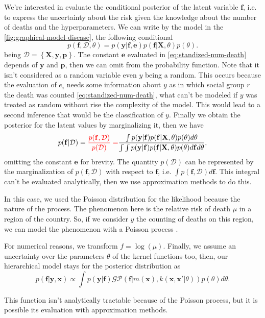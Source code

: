 We're interested in evaluate the conditional posterior of the latent variable $\mathbf{f}$, i.e. to express the uncertainty about the risk given the knowledge about the number of deaths and the hyperparameters. We can write by the model in the \autoref{fig:graphical-model-disease}, the following conditional
%
\begin{equation}
    p(\mathbf{f},\mathcal{D},\theta) = p(\mathbf{y}|\mathbf{f},\mathbf{e})p(\mathbf{f}|\mathbf{X},\theta)p(\theta).
    \label{eq:model-total-density}
\end{equation}
%
being $\mathcal{D}=\left\{ \mathbf{X},\mathbf{y}, \mathbf{p} \right\}$. The constant $\mathbf{e}$ evaluated in \eqref{eq:standized-num-death} depends of $\mathbf{y}$ and $\mathbf{p}$, then we can omit from the probability function. Note that it isn't considered as a random variable even $y$ being a random. This occurs because the evaluation of $e_i$ needs some information about $y$ as in which social group $r$ the death was counted \eqref{eq:standized-num-death}, what can't be modeled if $y$ was treated as random without rise the complexity of the model. This would lead to a second inference that would be the classification of $y$. Finally we obtain the posterior for the latent values by marginalizing it, then we have
%
\begin{equation}
    p(\mathbf{f}|\mathcal{D})={\color{red}
    \frac{p(\mathbf{f},\mathcal{D})}{p(\mathcal{D})}=}
    \frac{\int p(\mathbf{y}|\mathbf{f})p(\mathbf{f}|\mathbf{X},\theta)p(\theta) d\theta}{\int \int p(\mathbf{y}|\mathbf{f})p(\mathbf{f}|\mathbf{X},\theta)p(\theta) d\mathbf{f} d\theta},
\end{equation}
%
omitting the constant $\mathbf{e}$ for brevity. The quantity $p(\mathcal{D})$ can be represented by the marginalization of $p(\mathbf{f},\mathcal{D})$ with respect to $\mathbf{f}$, i.e. $\int p(\mathbf{f},\mathcal{D}) d\mathbf{f}$. This integral can't be evaluated analytically, then we use approximation methods to do this.
{\color{red}
%

In this case, we used the Poisson distribution for the likelihood because the nature of the process. The phenomenon here is the relative risk of death $\mu$ in a region of the country. So, if we consider $y$ the counting of deaths on this region, we can model the phenomenon with a Poisson process \cite{Vanhatalo2010Vehtari}.

For numerical reasons, we transform $f=\log(\mu)$. Finally, we assume an uncertainty over the parameters $\theta$ of the kernel functions too, then, our hierarchical model stays for the posterior distribution as 
%
\begin{equation}
    p(\mathbf{f}|\mathbf{y},\mathbf{x}) \propto \int p(\mathbf{y}|\mathbf{f})\mathcal{GP}\left(\mathbf{f} | m(\mathbf{x}),k(\mathbf{x},\mathbf{x}'|\theta) \right)p(\theta) d\theta.
\end{equation}

This function isn't analytically tractable because of the Poisson process, but it is possible its evaluation with approximation methods.

}
